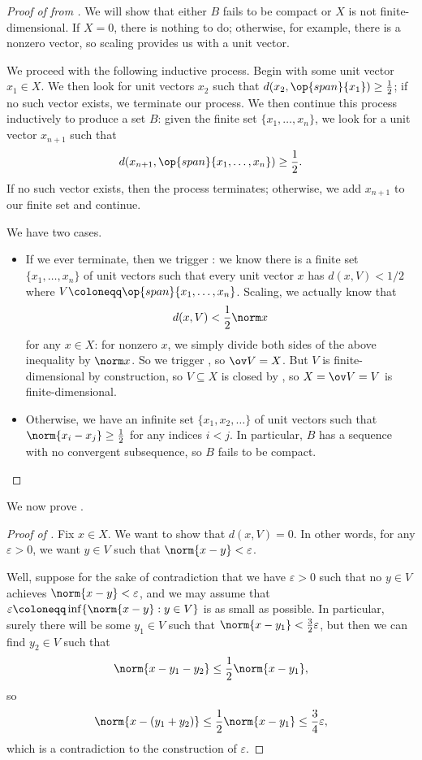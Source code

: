\documentclass[../notes.tex]{subfiles}
\begin{document}
\begin{proof}[Proof of  from ]
	We will show that either $B$ fails to be compact or $X$ is not finite-dimensional. If $X=0$, there is nothing to do; otherwise, for example, there is a nonzero vector, so scaling provides us with a unit vector.

	We proceed with the following inductive process. Begin with some unit vector $x_1\in X$. We then look for unit vectors $x_2$ such that $d(x_2,\op{span}\{x_1\})\ge\frac12$; if no such vector exists, we terminate our process. We then continue this process inductively to produce a set $B$: given the finite set $\{x_1,\ldots,x_n\}$, we look for a unit vector $x_{n+1}$ such that
	\[d(x_{n+1},\op{span}\{x_1,\ldots,x_n\})\ge\frac12.\]
	If no such vector exists, then the process terminates; otherwise, we add $x_{n+1}$ to our finite set and continue.
	
	We have two cases.
	\begin{itemize}
		\item If we ever terminate, then we trigger : we know there is a finite set $\{x_1,\ldots,x_n\}$ of unit vectors such that every unit vector $x$ has $d(x,V)<1/2$ where $V\coloneqq\op{span}\{x_1,\ldots,x_n\}$. Scaling, we actually know that
		\[d(x,V)<\frac12\norm x\]
		for any $x\in X$: for nonzero $x$, we simply divide both sides of the above inequality by $\norm x$. So we trigger , so $\ov V=X$. But $V$ is finite-dimensional by construction, so $V\subseteq X$ is closed by , so $X=\ov V=V$ is finite-dimensional.
		\item Otherwise, we have an infinite set $\{x_1,x_2,\ldots\}$ of unit vectors such that $\norm{x_i-x_j}\ge\frac12$ for any indices $i<j$.  In particular, $B$ has a sequence with no convergent subsequence, so $B$ fails to be compact.
		\qedhere
	\end{itemize}
\end{proof}
We now prove .
\begin{proof}[Proof of ]
	Fix $x\in X$. We want to show that $d(x,V)=0$. In other words, for any $\varepsilon>0$, we want $y\in V$ such that $\norm{x-y}<\varepsilon$.

	Well, suppose for the sake of contradiction that we have $\varepsilon>0$ such that no $y\in V$ achieves $\norm{x-y}<\varepsilon$, and we may assume that $\varepsilon\coloneqq\inf\{\norm{x-y}:y\in V\}$ is as small as possible. In particular, surely there will be some $y_1\in V$ such that $\norm{x-y_1}<\frac32\varepsilon$, but then we can find $y_2\in V$ such that
	\[\norm{x-y_1-y_2}\le\frac12\norm{x-y_1},\]
	so
	\[\norm{x-(y_1+y_2)}\le\frac12\norm{x-y_1}\le\frac34\varepsilon,\]
	which is a contradiction to the construction of $\varepsilon$.
\end{proof}
\end{document}
